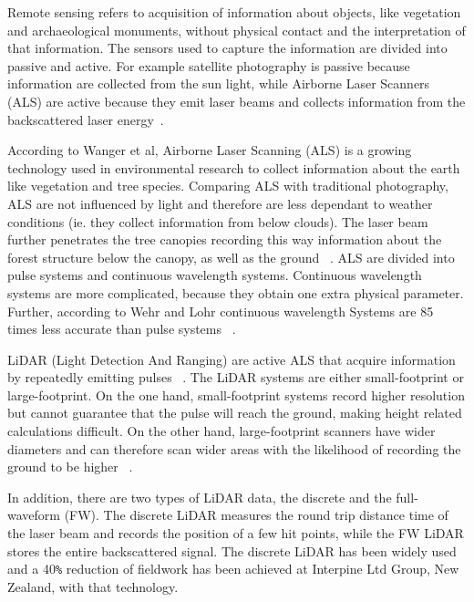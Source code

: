 \documentclass{subfiles}
\begin{document}
	\par Remote sensing refers to acquisition of information about objects, like vegetation and archaeological monuments, without physical contact and the interpretation of that information.  The sensors used to capture the information are divided into passive and active. For example satellite photography is passive because information are collected from the sun light, while Airborne Laser Scanners (ALS) are active because they emit laser beams and collects information from the backscattered laser energy~\cite{Smith2012}.
	
	\par According to Wanger et al, Airborne Laser Scanning (ALS) is a growing technology used in environmental research to collect information about the earth like vegetation and tree species. Comparing ALS with traditional photography, ALS are not influenced by light and therefore are less dependant to weather conditions (ie. they collect information from below clouds). The laser beam further penetrates the tree canopies recording this way information about the forest structure below the canopy, as well as the ground ~\cite{Wanger2004}. ALS are divided into pulse systems and continuous wavelength systems. Continuous wavelength systems are more complicated, because they obtain one extra physical parameter. Further, according to Wehr and Lohr continuous wavelength Systems are 85 times less accurate than pulse systems ~\cite{Wehr1999}.
	
	\par LiDAR (Light Detection And Ranging) are active ALS that acquire information by repeatedly emitting pulses ~\cite{Wehr1999}. The LiDAR systems are either small-footprint or large-footprint. On the one hand, small-footprint systems record higher resolution but cannot guarantee that the pulse will reach the ground, making height related calculations difficult. On the other hand, large-footprint scanners have wider diameters and can therefore scan wider areas with the likelihood of recording the ground to be higher ~\cite{Mallet2009}. 
	
	\par In addition, there are two types of LiDAR data, the discrete and the full-waveform (FW). The discrete LiDAR measures the round trip distance time of the laser beam and records the position of a few hit points, while the FW LiDAR stores the entire backscattered signal. The discrete LiDAR has been widely used and a 40\verb|%| reduction of fieldwork has been achieved at Interpine Ltd Group, New Zealand, with that technology. 
	
\end{document}
